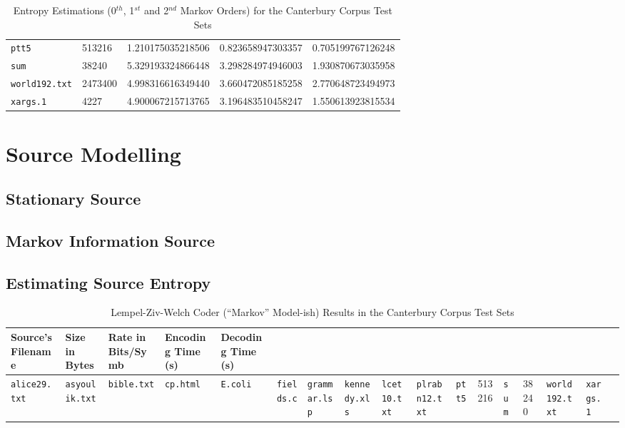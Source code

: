 \documentclass[a4paper, twocolumn]{article}
\begin{document}
\begin{table*}[t]
\begin{tabular}{lllll}
            \texttt{ptt5} & 513216 & 1.210175035218506 & 0.823658947303357 & 0.705199767126248 \\
            \texttt{sum} & 38240 & 5.329193324866448 & 3.298284974946003 & 1.930870673035958 \\
            \texttt{world192.txt} & 2473400 & 4.998316616349440 & 3.660472085185258 & 2.770648723494973 \\
            \texttt{xargs.1} & 4227 & 4.900067215713765 & 3.196483510458247 & 1.550613923815534 \\
        \bottomrule
        \end{tabular}
        \caption{Entropy Estimations (0$^{th}$, 1$^{st}$ and 2$^{nd}$ Markov Orders) for the Canterbury Corpus Test Sets}
        \label{tab:canterbury}
    \end{table*}

    \section{Source Modelling} \label{sec:source_modelling}
        \subsection{Stationary Source} \label{sec:stationary_source}
        \subsection{Markov Information Source} \label{sec:markov_information_source}
        \subsection{Estimating Source Entropy} \label{sec:estimating_source_entropy}

    \begin{table*}[t]
        \centering
        \begin{tabular}{lllll}
        \toprule
            Source's Filename & Size in Bytes & Rate in Bits/Symb & Encoding Time (s) & Decoding Time (s) \\
        \midrule
            \texttt{alice29.txt} &
            \texttt{asyoulik.txt} &
            \texttt{bible.txt} &
            \texttt{cp.html} &
            \texttt{E.coli} &
            \texttt{fields.c} &
            \texttt{grammar.lsp} &
            \texttt{kennedy.xls} &
            \texttt{lcet10.txt} &
            \texttt{plrabn12.txt} &
            \texttt{ptt5} & 513216 &
            \texttt{sum} & 38240 &
            \texttt{world192.txt} &
            \texttt{xargs.1} &
        \bottomrule
        \end{tabular}
        \caption{Lempel-Ziv-Welch Coder (``Markov'' Model-ish) Results in the Canterbury Corpus Test Sets}
        \label{tab:lzw}
    \end{table*}
\end{document}
